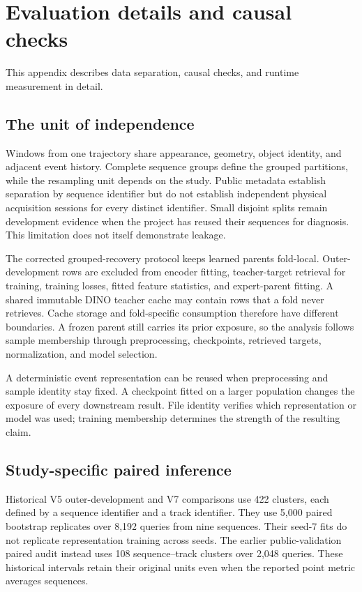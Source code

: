 \section{Evaluation details and causal checks}
\label{app:evaluation-details}
This appendix describes data separation, causal checks, and runtime measurement in detail.

\subsection{The unit of independence}
Windows from one trajectory share appearance, geometry, object identity, and adjacent event history. Complete sequence groups define the grouped partitions, while the resampling unit depends on the study. Public metadata establish separation by sequence identifier but do not establish independent physical acquisition sessions for every distinct identifier. Small disjoint splits remain development evidence when the project has reused their sequences for diagnosis. This limitation does not itself demonstrate leakage. 

The corrected grouped-recovery protocol keeps learned parents fold-local. Outer-development rows are excluded from encoder fitting, teacher-target retrieval for training, training losses, fitted feature statistics, and expert-parent fitting. A shared immutable DINO teacher cache may contain rows that a fold never retrieves. Cache storage and fold-specific consumption therefore have different boundaries. A frozen parent still carries its prior exposure, so the analysis follows sample membership through preprocessing, checkpoints, retrieved targets, normalization, and model selection. 

A deterministic event representation can be reused when preprocessing and sample identity stay fixed. A checkpoint fitted on a larger population changes the exposure of every downstream result. File identity verifies which representation or model was used; training membership determines the strength of the resulting claim. 

\subsection{Study-specific paired inference}
Historical V5 outer-development and V7 comparisons use 422 clusters, each defined by a sequence identifier and a track identifier. They use 5,000 paired bootstrap replicates over 8,192 queries from nine sequences. Their seed-7 fits do not replicate representation training across seeds. The earlier public-validation paired audit instead uses 108 sequence--track clusters over 2,048 queries. These historical intervals retain their original units even when the reported point metric averages sequences. 

